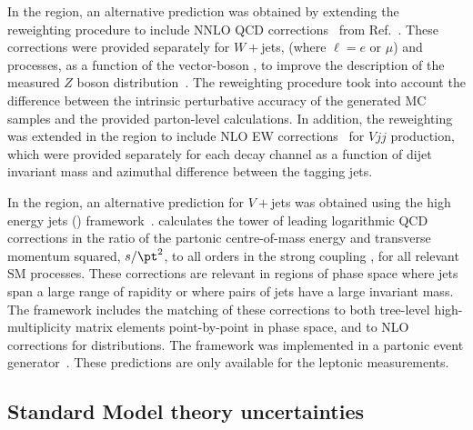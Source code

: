 \documentclass[atlasdraft=false, cernpreprint, UKenglish, texmf, orcidlogo]{atlasdoc}
\begin{document}
In the \onejet region, an alternative prediction was obtained by extending the reweighting procedure
to include NNLO QCD corrections~\cite{Gehrmann-DeRidder:2015wbt,Gehrmann-DeRidder:2016cdi,Boughezal:2016isb,Boughezal:2016dtm}
from Ref.~\cite{Lindert:2017olm}.
These corrections were provided separately for $W+$jets, \Zlljets (where $\ell=e  \text{ or } \mu$) and
\Znunujets processes, as a function of the vector-boson \pT,
to improve the description of the measured $Z$ boson \pT distribution~\cite{STDM-2016-01}.
The reweighting procedure took into account the difference between the intrinsic perturbative accuracy
of the generated MC samples and the provided parton-level calculations.
In addition, the reweighting was extended in the \vbf region to include NLO EW corrections~\cite{Lindert:2022ejn}
for $Vjj$ production, which were provided separately for each decay channel as a function of
dijet invariant mass and azimuthal difference between the tagging jets.
 
In the \vbf region, an alternative prediction for $V+$jets was obtained using the high energy jets (\HEJ)
framework~\cite{Andersen:2009nu,Andersen:2011hs}. \HEJ calculates the tower of leading logarithmic QCD corrections
in the ratio of the partonic centre-of-mass energy and transverse momentum squared, $s/\pt^2$, to all orders in the strong coupling \alphas,
for all relevant SM processes.
These corrections are relevant in regions of phase space where jets span a large range of rapidity or where pairs
of jets have a large invariant mass. The framework includes the matching of these corrections to both tree-level high-multiplicity
matrix elements point-by-point in phase space, and to NLO corrections for distributions.
The framework was implemented in a partonic event generator~\cite{Andersen:2023kuj}. These predictions are only
available for the leptonic measurements.
 
\subsection{Standard Model theory uncertainties}
 
\end{document}
